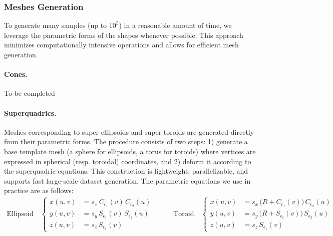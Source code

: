 \subsubsection{Meshes Generation}
\label{sssec:mesh-generation}

To generate many samples (up to $10^5$) in a reasonable amount of time, we leverage the parametric forms of the shapes whenever possible. This approach minimizes computationally intensive operations and allows for efficient mesh generation.

\paragraph{Cones.} To be completed

\paragraph{Superquadrics.} Meshes corresponding to super ellipsoids and super toroids are generated directly from their parametric forms. The procedure consists of two steps: 1) generate a base template mesh (a sphere for ellipsoids, a torus for toroids) where vertices are expressed in spherical (resp. toroidal) coordinates, and 2) deform it according to the superquadric equations. This construction is lightweight, parallelizable, and supports fast large-scale dataset generation. The parametric equations we use in practice are as follows:
\begin{equation}
\begin{aligned}
\text{Ellipsoid} \quad
\begin{cases}
x(u,v) &= s_x \, C_{\epsilon_1}(v) \, C_{\epsilon_2}(u) \\
y(u,v) &= s_y \, S_{\epsilon_1}(v) \, S_{\epsilon_2}(u) \\
z(u,v) &= s_z \, S_{\epsilon_1}(v)
\end{cases}
\end{aligned}
\qquad
\begin{aligned}
\text{Toroid} \quad
\begin{cases}
x(u,v) &= s_x \, \bigl(R + C_{\epsilon_1}(v)\bigr) \, C_{\epsilon_2}(u) \\
y(u,v) &= s_y \, \bigl(R + S_{\epsilon_1}(v)\bigr) \, S_{\epsilon_2}(u) \\
z(u,v) &= s_z \, S_{\epsilon_1}(v)
\end{cases}
\end{aligned}
\end{equation}


